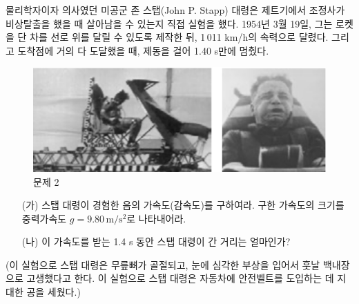 \documentclass[APS,floatfix,nofootinbib,superscriptaddress,fleqn,preprint]{revtex4}
\begin{document}
물리학자이자 의사였던 미공군 존 스탭(John P. Stapp) 대령은 제트기에서
조정사가 비상탈출을 했을 때 살아남을 수 있는지 직접 실험을
했다. 1954년 3월 19일, 그는 로켓을 단 차를 선로 위를 달릴 수 있도록
제작한 뒤,  1\,011 km/h의 속력으로 달렸다. 그리고 도착점에 거의 다
도달했을 때, 제동을 걸어 1.40 s만에 멈췄다. 
\begin{figure}[ht]
  \centering
\includegraphics[scale=0.5]{Qfig3-2-20220307.png}  
  \caption{문제 2}
  \label{fig:2}
\end{figure}
\begin{itemize}
\item[(가)] 스탭 대령이 경험한 음의 가속도(감속도)를 구하여라. 구한
  가속도의 크기를 중력가속도 $g=9.80\,\mathrm{m/s^2}$로 나타내어라.
\item[(나)] 이 가속도를 받는 1.4 s  동안 스탭 대령이 간 거리는 얼마인가?
\end{itemize}
(이 실험으로 스탭 대령은 무릎뼈가 골절되고, 눈에 심각한 부상을 입어서
훗날 백내장으로 고생했다고 한다. 이 실험으로 스탭 대령은 자동차에 안전벨트를
도입하는 데 지대한 공을 세웠다.) \\
\end{document}
